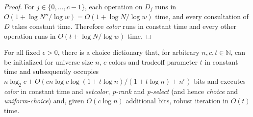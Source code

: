 \documentclass[envcountsame,envcountsect,undated,nolinenumbers]{lnthi}
\def\Tvn#1{\hbox{\textit{#1\/}}}
\def\TbbbN{\mathbb{N}}
\begin{document}
\begin{proof}
For $j\in\{0,\ldots,c-1\}$,
each operation on $D_j$ runs in
$O(1+{{\log N''}/{\log w}})=O(1+{{\log N}/{\log w}})$ time, 
and every consultation of $D$
takes constant time.
Therefore \Tvn{color} runs in constant time
and every other operation
runs in $O(t+{{\log N}/{\log w}})$ time.
\end{proof}

\begin{theorem}
\label{thm:p}For all fixed $\epsilon>0$,
there is a choice dictionary that, for arbitrary
$n,c,t\in\TbbbN$,
can be initialized for universe
size $n$, $c$ colors and tradeoff parameter $t$
in constant time
and subsequently occupies
$n\log_2 c+O({{c n\log c\log(1+t\log n)}/{(1+t\log n)}}+n^\epsilon)$
bits and executes \Tvn{color} in
constant time and \Tvn{setcolor},
\Tvn{p-rank} and \Tvn{p-select} (and hence \Tvn{choice}
and \Tvn{uniform-choice})
and, given $O(c\log n)$ additional bits,
robust iteration in $O(t)$ time.
\end{theorem}
\end{document}
